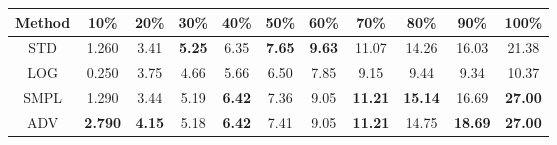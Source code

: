 \documentclass{standalone}
\begin{document}
\begin{tabular}{c|cccccccccc}
      \toprule
      Method & 10\% & 20\% & 30\% & 40\% & 50\% & 60\% & 70\% & 80\% & 90\% & 100\% \\
      \midrule
STD & 1.260 & 3.41 & \textbf{5.25} & 6.35 & \textbf{7.65} & \textbf{9.63} & 11.07 & 14.26 & 16.03 & 21.38\\
LOG & 0.250 & 3.75 & 4.66 & 5.66 & 6.50 & 7.85 & 9.15 & 9.44 & 9.34 & 10.37\\
SMPL & 1.290 & 3.44 & 5.19 & \textbf{6.42} & 7.36 & 9.05 & \textbf{11.21} & \textbf{15.14} & 16.69 & \textbf{27.00}\\
ADV & \textbf{2.790} & \textbf{4.15} & 5.18 & \textbf{6.42} & 7.41 & 9.05 & \textbf{11.21} & 14.75 & \textbf{18.69} & \textbf{27.00}\\
  \bottomrule
\end{tabular}
\end{document}
